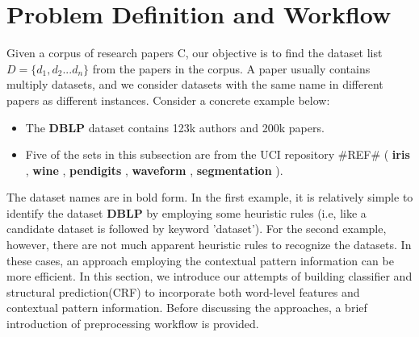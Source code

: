 \documentclass[10pt]{article}
\begin{document}
\section{Problem Definition and Workflow}
Given a corpus of research papers C, our objective is to find the dataset list $D = \{ d_1, d_2...d_n\}$ from the papers in the corpus. A paper usually contains multiply datasets, and we consider datasets with the same name in different papers as different instances. Consider a concrete example below: 
\begin{itemize}
\item The \textbf{DBLP} dataset contains 123k authors and 200k papers. 
\item Five of the sets in this subsection are from the UCI repository \#REF\# ( \textbf{iris} , \textbf{wine} , \textbf{pendigits} , \textbf{waveform} , \textbf{segmentation} ).
\end{itemize}
The dataset names are in bold form. In the first example, it is relatively simple to identify the dataset \textbf{DBLP} by employing some heuristic rules (i.e, like a candidate dataset is followed by keyword 'dataset'). For the second example, however, there are not much apparent heuristic rules to recognize 
the datasets. In these cases, an approach employing the contextual pattern information can be more efficient. In this section, we introduce our attempts of building classifier and structural prediction(CRF) to incorporate both word-level features and contextual pattern information. Before discussing the approaches, a brief introduction of preprocessing workflow is provided. 
\end{document}
